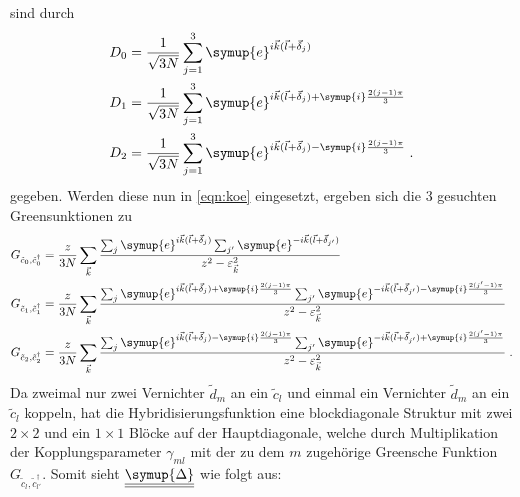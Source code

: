 sind durch
\begin{equation}
    \begin{aligned}
    D_0 &= \frac{1}{\sqrt{3N}}\sum_{j=1}^3\symup{e}^{i{\vec{k}}(\vec{l}+\vec{\delta}_j)} \\
    D_1 &= \frac{1}{\sqrt{3N}}\sum_{j=1}^3\symup{e}^{i{\vec{k}}(\vec{l}+\vec{\delta}_j)+\symup{i}\frac{2(j-1)\pi}{3}}  \\
    D_2 &= \frac{1}{\sqrt{3N}}\sum_{j=1}^3\symup{e}^{i{\vec{k}}(\vec{l}+\vec{\delta}_j)-\symup{i}\frac{2(j-1)\pi}{3}} \; . \label{eqn:fourierko}
    \end{aligned}    
\end{equation}
gegeben.
Werden diese nun in \eqref{eqn:koe} eingesetzt, ergeben sich die 3 gesuchten Greensunktionen zu 
\begin{align}
    G_{\tilde{c}_0, \tilde{c}^\dagger_0} &= \frac{z}{3N} \sum_{\vec{k}} \frac{\sum_j \symup{e}^{i{\vec{k}}(\vec{l}+\vec{\delta}_j)} \sum_{j'} \symup{e}^{-i{\vec{k}}(\vec{l}+\vec{\delta}_{j'})}                                                            }{z^2-\varepsilon_{\vec{k}}^2} \\
    G_{\tilde{c}_1, \tilde{c}^\dagger_1} &= \frac{z}{3N} \sum_{\vec{k}} \frac{\sum_j \symup{e}^{i{\vec{k}}(\vec{l}+\vec{\delta}_j)+\symup{i}\frac{2(j-1)\pi}{3}} \sum_{j'} \symup{e}^{-i{\vec{k}}(\vec{l}+\vec{\delta}_{j'})-\symup{i}\frac{2(j'-1)\pi}{3}} }{z^2-\varepsilon_{\vec{k}}^2} \\
    G_{\tilde{c}_2, \tilde{c}^\dagger_2} &= \frac{z}{3N} \sum_{\vec{k}} \frac{\sum_j \symup{e}^{i{\vec{k}}(\vec{l}+\vec{\delta}_j)-\symup{i}\frac{2(j-1)\pi}{3}} \sum_{j'} \symup{e}^{-i{\vec{k}}(\vec{l}+\vec{\delta}_{j'})+\symup{i}\frac{2(j'-1)\pi}{3}} }{z^2-\varepsilon_{\vec{k}}^2} \; .
\end{align}
Da zweimal nur zwei Vernichter $\tilde{d}_m$ an ein $\tilde{c}_l$ und einmal ein  Vernichter $\tilde{d}_m$ an ein $\tilde{c}_l$ koppeln, hat die Hybridisierungsfunktion
eine blockdiagonale Struktur mit zwei $2 \times 2$ und ein $1 \times 1$ Blöcke auf der Hauptdiagonale, welche 
durch Multiplikation der Kopplungsparameter $\gamma_{ml}$ mit der zu dem $m$ zugehörige Greensche Funktion $G_{\tilde{c}_l, \tilde{c}^\dagger_{l'}}$.
Somit sieht $\underline{\underline{\symup{\Delta}}}$ wie folgt aus:
